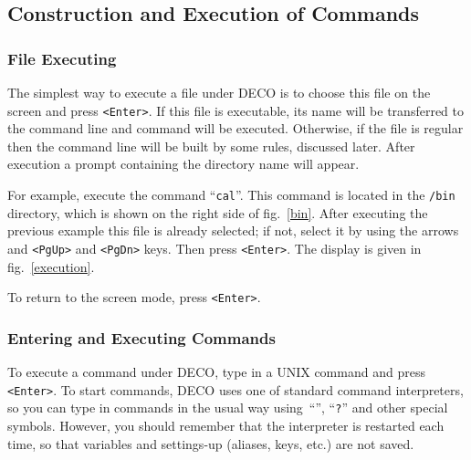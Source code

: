 \subsection{Construction and Execution of Commands}

\subsubsection{File Executing}

The simplest way to execute a file under DECO is to choose this file
on the screen and press {\tt <Enter>}. If this file is executable, its name
will be transferred to the command line and command
will be executed. Otherwise, if the file is regular
then the command line will be built by some rules, discussed later.
After execution a prompt containing the directory name will appear.

For example, execute the command ``{\tt cal}''. This command is
located in the {\tt /bin} directory, which is shown on the
right side of fig.~\ref{bin}. After executing the previous
example this file is already selected; if not, select it by 
using the arrows and {\tt <PgUp>} and {\tt <PgDn>} keys.
Then press {\tt <Enter>}. The display is given in fig.~\ref{execution}.
 

To return to the screen mode, press {\tt <Enter>}.

\subsubsection{Entering and Executing Commands}

To execute a command under DECO, type in a UNIX command and press {\tt <Enter>}.
To start commands, DECO uses one of standard command interpreters, so you
can type in commands in the usual way using~``{\tt *}'', ``{\tt ?}'' and
other special symbols. However, you should remember that
the interpreter is restarted each time, so that variables 
and settings-up (aliases, keys, etc.) are not saved.

